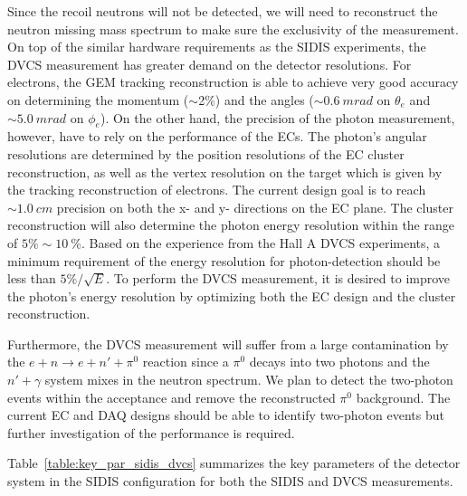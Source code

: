 Since the recoil neutrons will not be detected, we will need to reconstruct the neutron missing mass spectrum to make sure the exclusivity of the measurement. On top of the similar hardware requirements as the SIDIS experiments, the DVCS measurement has greater demand on the detector resolutions. For electrons, the GEM tracking reconstruction is able to achieve very good accuracy on determining the momentum ($\sim$2\%) and the angles ($\sim 0.6~mrad$ on $\theta_{e}$ and $\sim 5.0~mrad$ on $\phi_{e}$). On the other hand, the precision of the photon measurement, however, have to rely on the performance of the ECs. The photon's angular resolutions are determined by the position resolutions of the EC cluster reconstruction, as well as the vertex resolution on the target which is given by the tracking reconstruction of electrons. The current design goal is to reach $\sim 1.0~cm$ precision on both the x- and y- directions on the EC plane. The cluster reconstruction will also determine the photon energy resolution within the range of $5\%\sim 10~\%$. Based on the experience from the Hall A DVCS experiments, a minimum requirement of the energy resolution for photon-detection should be less than $5\%/\sqrt{E}$. To perform the DVCS measurement, it is desired to improve the photon's energy resolution by optimizing both the EC design and the cluster reconstruction. 

Furthermore, the DVCS measurement will suffer from a large contamination by the $e+n\rightarrow e+n'+\pi^{0}$ reaction since a $\pi^{0}$ decays into two photons and the $n'+\gamma$ system mixes in the neutron spectrum. We plan to detect the two-photon events within the acceptance and remove the reconstructed $\pi^{0}$ background. The current EC and DAQ designs should be able to identify two-photon events but further investigation of the performance is required.  

Table~\ref{table:key_par_sidis_dvcs} summarizes the key parameters of the detector system in the SIDIS configuration for both the SIDIS and DVCS measurements. 

